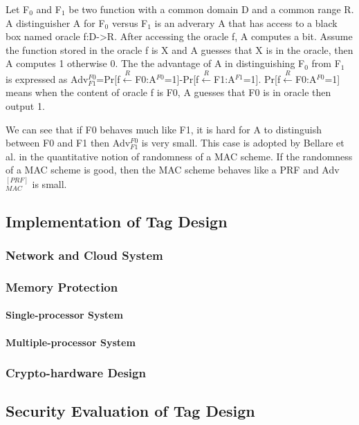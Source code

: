 \documentclass{article}
\begin{document}
Let F$_0$ and F$_1$ be two function with a common domain D and a common range R. A distinguisher A for F$_0$ versus F$_1$ is an adverary A that has access to a black box named oracle f:D->R. After accessing the oracle f, A computes a bit. Assume the function stored in the oracle f is X and A guesses that X is in the oracle, then A computes 1 otherwise 0. The the advantage of A in distinguishing F$_0$ from F$_1$ is expressed as Adv$^{F0}_{F1}$=Pr[f$\stackrel{R}{\longleftarrow}$F0:A$^{F0}$=1]-Pr[f$\stackrel{R}{\longleftarrow}$F1:A$^{F1}$=1]. Pr[f$\stackrel{R}{\longleftarrow}$F0:A$^{F0}$=1] means when the content of oracle f is F0, A guesses that F0 is in oracle then output 1.

We can see that if F0 behaves much like F1, it is hard for A to distinguish between F0 and F1 then Adv$^{F0}_{F1}$ is very small. This case is adopted by Bellare et al. in the quantitative notion of randomness of a MAC scheme. If the randomness of a MAC scheme is good, then the MAC scheme behaves like a PRF and Adv$^{[PRF]}_{MAC}$ is small. 
\subsection{Implementation of Tag Design}
\subsubsection{Network and Cloud System}
\subsubsection{Memory Protection}
\paragraph{Single-processor System}
\paragraph{Multiple-processor System}
\subsubsection{Crypto-hardware Design}
\subsection{Security Evaluation of Tag Design}
\end{document}
